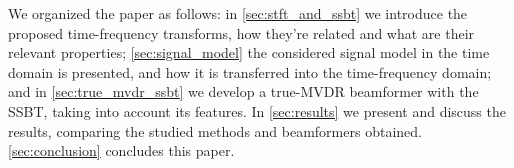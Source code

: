 We organized the paper as follows:
in \cref{sec:stft_and_ssbt} we introduce the proposed time-frequency transforms, how they're related and what are their relevant properties;
\cref{sec:signal_model} the considered signal model in the time domain is presented, and how it is transferred into the time-frequency domain;
and in \cref{sec:true_mvdr_ssbt} we develop a true-MVDR beamformer with the SSBT, taking into account its features.
In \cref{sec:results} we present and discuss the results, comparing the studied methods and beamformers obtained.
\cref{sec:conclusion} concludes this paper.